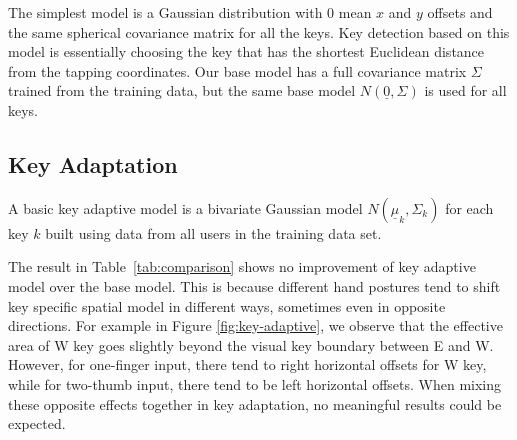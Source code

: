 \documentclass{sigchi}
\begin{document}
The simplest model is a Gaussian distribution with 0 mean $x$ and $y$
 offsets and the same spherical covariance matrix for all the keys. Key
detection based on this model is essentially choosing the key that has the shortest Euclidean distance from the tapping coordinates. 
Our base model has a full covariance matrix $\Sigma$ trained from the
training data, but the same base model $N(\underline 0, \Sigma)$ is used for all keys.

\subsection{Key Adaptation}
A basic key adaptive model is a bivariate Gaussian model
$N(\underline\mu_k, \Sigma_k)$ for each key $k$ built  using data from all users in the training data set.

The result in Table~\ref{tab:comparison} shows no improvement of key adaptive model over the base model. This is because different hand postures tend to shift key specific spatial model in different ways, sometimes even in opposite directions. For example in Figure \ref{fig:key-adaptive}, we observe that the effective area of W key goes slightly beyond the visual key boundary between E and W. However, for one-finger input, there tend to right horizontal offsets for W key, while for two-thumb input, there tend to be left horizontal offsets. When mixing these opposite effects together in key adaptation, no meaningful results could be expected.
\end{document}
